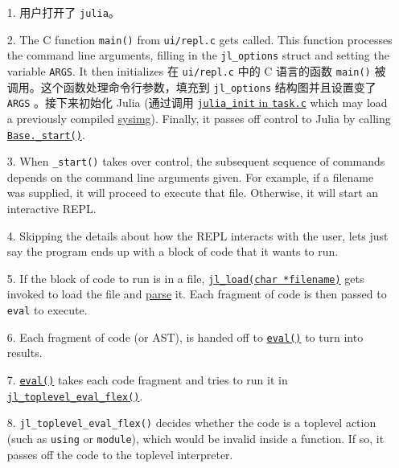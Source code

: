 \begin{itemize}
\item[1.  ] 用户打开了 \texttt{julia}。


\item[2.  ] The C function \texttt{main()} from \texttt{ui/repl.c} gets called. This function processes the command line arguments, filling in the \texttt{jl\_options} struct and setting the variable \texttt{ARGS}. It then initializes 在 \texttt{ui/repl.c} 中的 C 语言的函数 \texttt{main()} 被调用。这个函数处理命令行参数，填充到 \texttt{jl\_options} 结构图并且设置变了 \texttt{ARGS} 。接下来初始化 Julia (通过调用  \href{https://github.com/JuliaLang/julia/blob/master/src/task.c}{\texttt{julia\_init} in \texttt{task.c}} which may load a previously compiled \hyperlink{6082338945993475185}{sysimg}). Finally, it passes off control to Julia by calling \href{https://github.com/JuliaLang/julia/blob/master/base/client.jl}{\texttt{Base.\_start()}}.


\item[3.  ] When \texttt{\_start()} takes over control, the subsequent sequence of commands depends on the command line arguments given. For example, if a filename was supplied, it will proceed to execute that file. Otherwise, it will start an interactive REPL.


\item[4.  ] Skipping the details about how the REPL interacts with the user, let{\textquotesingle}s just say the program ends up with a block of code that it wants to run.


\item[5.  ] If the block of code to run is in a file, \href{https://github.com/JuliaLang/julia/blob/master/src/toplevel.c}{\texttt{jl\_load(char *filename)}} gets invoked to load the file and \hyperlink{14838640034628506824}{parse} it. Each fragment of code is then passed to \texttt{eval} to execute.


\item[6.  ] Each fragment of code (or AST), is handed off to \hyperlink{7507639810592563424}{\texttt{eval()}} to turn into results.


\item[7.  ] \hyperlink{7507639810592563424}{\texttt{eval()}} takes each code fragment and tries to run it in \href{https://github.com/JuliaLang/julia/blob/master/src/toplevel.c}{\texttt{jl\_toplevel\_eval\_flex()}}.


\item[8.  ] \texttt{jl\_toplevel\_eval\_flex()} decides whether the code is a {\textquotedbl}toplevel{\textquotedbl} action (such as \texttt{using} or \texttt{module}), which would be invalid inside a function. If so, it passes off the code to the toplevel interpreter.



\end{itemize}
